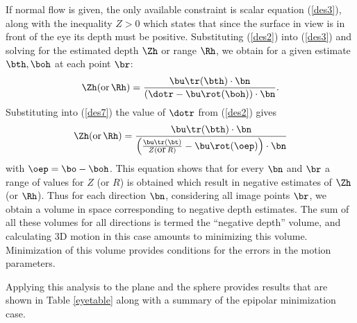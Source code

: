\documentclass[10pt,twocolumn]{article}
\begin{document}
If normal flow is given, the
only available constraint is scalar equation (\ref{des3}), along with the
inequality $Z > 0$ which states that since the surface in view is in
front of the eye its depth must be positive. Substituting
(\ref{des2}) into (\ref{des3}) and solving
for the estimated depth $\Zh$ or range $\Rh$, we obtain for a given
estimate $\bth, \boh$ at each point $\br$:
\begin{equation}
  \label{des7}
  \Zh (\mbox{or}\, \Rh ) = \frac{\bu\tr (\bth ) \cdot \bn}{\left(\dotr
  - \bu\rot (\boh )\right) \cdot \bn}.
\end{equation}
Substituting into
(\ref{des7}) the value of $\dotr$ from (\ref{des2}) gives
\begin{displaymath}
  \Zh (\mbox{or}\, \Rh) = \frac{\bu\tr(\bth) \cdot
  \bn}{\left(\frac{\bu\tr(\bt)}{Z(\mbox{or}\, R)} -
  \bu\rot(\oep)\right) \cdot \bn}
\end{displaymath}
with $\oep = \bo - \boh$. This equation shows that for every $\bn$ and $\br$ a range of values
for $Z$ (or $R$) is obtained which result in negative estimates of
$\Zh$ (or $\Rh$). Thus for each direction $\bn$, considering all
image points $\br$, we obtain a volume in space corresponding to
negative depth estimates. The sum of all these volumes for all directions is
termed the ``negative depth'' volume, and calculating 3D motion in this
case amounts to minimizing this volume.  Minimization of this volume
provides conditions for the errors in the motion parameters.

Applying this analysis to the plane and the sphere provides results
that are shown in Table \ref{eyetable} along with a summary of the
epipolar minimization case.
\end{document}
